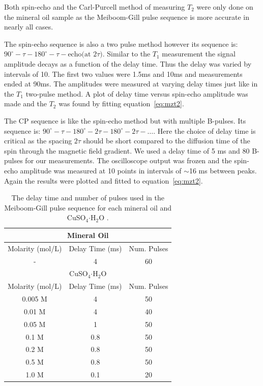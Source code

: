 \documentclass[
reprint,
amsmath,amssymb,
aps,
tikz,
border=5pt
]{revtex4-1}
\newcommand*{\cuso}[1][]{CuSO$_{4} \boldsymbol{\cdot} $H$_2$O }
\begin{document}
    Both spin-echo and the Carl-Purcell method of measuring $T_2$ were only done on the mineral oil sample as the Meiboom-Gill pulse sequence is more accurate in nearly all cases.

    The spin-echo sequence is also a two pulse method however its sequence is: $90^{\circ}- \tau  - 180^{\circ}-\tau-\text{echo(at $2\tau$)}$. Similar to the $T_1$ measurement the signal amplitude decays as a function of the delay time. Thus the delay was varied by intervals of 10. The first two values were 1.5ms and 10ms and measurements ended at 90ms. The amplitudes were measured at varying delay times just like in the $T_1$ two-pulse method. A plot of delay time versus spin-echo amplitude was made and the $T_2$ was found by fitting equation~\ref{eq:mzt2}.

    The CP sequence is like the spin-echo method but with multiple B-pulses. Its sequence is: $90^{\circ}- \tau  - 180^{\circ}-2\tau- 180^{\circ}-2\tau- \dots$. Here the choice of delay time is critical as the spacing $2\tau$ should be short compared to the diffusion time of the spin through the magnetic field gradient. We used a delay time of 5 ms and 80 B-pulses for our measurements. The oscilloscope output was frozen and the spin-echo amplitude was measured at 10 points in intervals of $\sim$16 ms between peaks. Again the results were plotted and fitted to equation~\ref{eq:mzt2}.


    \begin{table}
    \begin{center}
    \begin{tabular}[t]{ |c|c|c| }
        \hline
        \multicolumn{3}{|c|}{Mineral Oil} \\ \hline 
        Molarity (mol/L) & Delay Time (ms) & Num. Pulses \\ \hline
        - & 4 & 60 \\ \hline 
    
        \multicolumn{3}{|c|}{CuSO$_{4} \boldsymbol{\cdot} $H$_2$O} \\ \hline
        Molarity (mol/L) & Delay Time (ms) & Num. Pulses \\ \hline
        0.005 M & 4 & 50 \\ \hline 
        0.01 M & 4 & 40  \\ \hline
        0.05 M & 1 & 50  \\ \hline 
        0.1 M & 0.8 & 50  \\ \hline
        0.2 M & 0.8 & 50  \\ \hline 
        0.5 M & 0.8 & 50  \\ \hline
        1.0 M & 0.1 & 20  \\ \hline 
    \end{tabular}
    \caption{The delay time and number of pulses used in the Meiboom-Gill pulse sequence for each mineral oil and \cuso. }
    \label{tab:delaytime}
    \end{center}
    \end{table}
\end{document}
